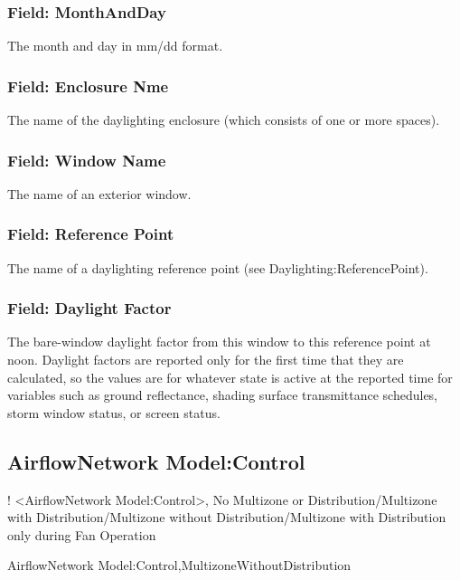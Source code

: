 \subsubsection{Field: MonthAndDay}\label{field-sky-daylight-factors-monthandday}
The month and day in mm/dd format.

\subsubsection{Field: Enclosure Nme}\label{field-sky-daylight-factors-encl-name}
The name of the daylighting enclosure (which consists of one or more spaces).

\subsubsection{Field: Window Name}\label{field-sky-daylight-factors-window-name}
The name of an exterior window.

\subsubsection{Field: Reference Point}\label{field-sky-daylight-factors-ref-point}
The name of a daylighting reference point (see Daylighting:ReferencePoint).

\subsubsection{Field: Daylight Factor}\label{field-sky-daylight-factors-factor}
The bare-window daylight factor from this window to this reference point at noon. Daylight factors are reported only for the first time that they are calculated, so the values are for whatever state is active at the reported time for variables such as ground reflectance, shading surface transmittance schedules, storm window status, or screen status.

\subsection{AirflowNetwork Model:Control}\label{airflownetwork-modelcontrol}

! \textless{}AirflowNetwork Model:Control\textgreater{}, No Multizone or Distribution/Multizone with Distribution/Multizone without Distribution/Multizone with Distribution only during Fan Operation

AirflowNetwork Model:Control,MultizoneWithoutDistribution

